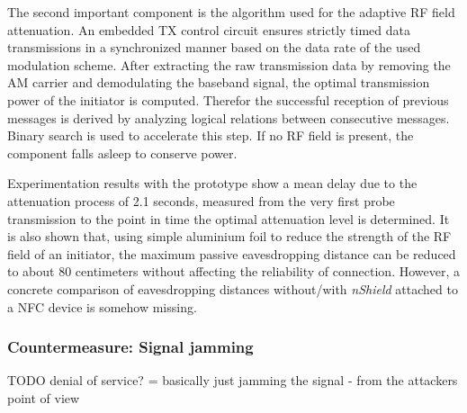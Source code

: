 \documentclass[12pt,a4paper]{article}
\begin{document}
The second important component is the algorithm used for the adaptive RF field attenuation. An embedded TX control circuit ensures strictly timed data transmissions in a synchronized manner based on the data rate of the used modulation scheme. After extracting the raw transmission data by removing the AM carrier and demodulating the baseband signal, the optimal transmission power of the initiator is computed. Therefor the successful reception of previous messages is derived by analyzing logical relations between consecutive messages. Binary search is used to accelerate this step.	If no RF field is present, the component falls asleep to conserve power.



Experimentation results with the prototype show a mean delay due to the attenuation process of 2.1 seconds, measured from the very first probe transmission to the point in time the optimal attenuation level is determined. It is also shown that, using simple aluminium foil to reduce the strength of the RF field of an initiator, the maximum passive eavesdropping distance can be reduced to about 80 centimeters without affecting the reliability of connection. However, a concrete comparison of eavesdropping distances without/with \emph{nShield} attached to a NFC device is somehow missing.

\subsubsection{Countermeasure: Signal jamming}



TODO denial of service? = basically just jamming the signal - from the attackers point of view
\end{document}
